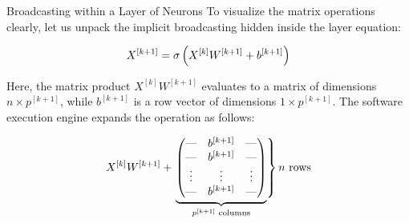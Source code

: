 \begin{frame}{Broadcasting within a Layer of Neurons}
	To visualize the matrix operations clearly, let us unpack the implicit broadcasting hidden inside the layer equation:
	
	\begin{equation*}
		X^{[k+1]} = \operatorname{\sigma}\left(X^{[k]} W^{[k+1]} + b^{[k+1]}\right)
	\end{equation*}
	
	Here, the matrix product $X^{[k]} W^{[k+1]}$ evaluates to a matrix of dimensions $n \times p^{[k+1]}$, while $b^{[k+1]}$ is a row vector of dimensions $1 \times p^{[k+1]}$. The software execution engine expands the operation as follows:
	
	\begin{equation*}
		X^{[k]} W^{[k+1]} + \left.
		\smash[b]{\underbrace{
				\begin{pmatrix}
					\text{---} & b^{[k+1]} & \text{---} \\
					\text{---} & b^{[k+1]} & \text{---} \\
					\vdots & \vdots & \vdots \\
					\text{---} & b^{[k+1]} & \text{---}
				\end{pmatrix}
			}_{p^{[k+1]} \text{ columns}}}
		\right\} n \text{ rows}
		\vphantom{\underbrace{\begin{matrix} \\ \\ \\ \end{matrix}}_{p^{[k]} \text{ columns}}}
	\end{equation*}
	
\end{frame}

